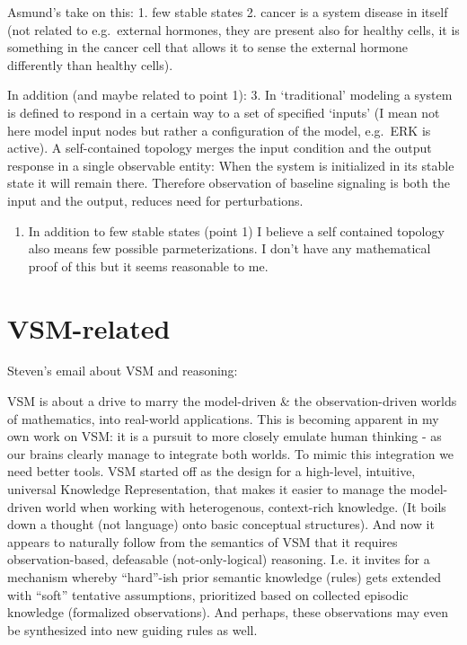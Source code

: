 \documentclass[
  12pt,
]{book}
\providecommand{\tightlist}{%
  \setlength{\itemsep}{0pt}\setlength{\parskip}{0pt}}
\begin{document}
Asmund's take on this:
1. few stable states
2. cancer is a system disease in itself (not related to e.g.~external hormones, they are present also for healthy cells, it is something in the cancer cell that allows it to sense the external hormone differently than healthy cells).

In addition (and maybe related to point 1):
3. In `traditional' modeling a system is defined to respond in a certain way to a set of specified `inputs' (I mean not here model input nodes but rather a configuration of the model, e.g.~ERK is active).
A self-contained topology merges the input condition and the output response in a single observable entity: When the system is initialized in its stable state it will remain there.
Therefore observation of baseline signaling is both the input and the output, reduces need for perturbations.

\begin{enumerate}
\def\labelenumi{\arabic{enumi}.}
\setcounter{enumi}{3}
\tightlist
\item
  In addition to few stable states (point 1) I believe a self contained topology also means few possible parmeterizations.
  I don't have any mathematical proof of this but it seems reasonable to me.
\end{enumerate}

\hypertarget{vsm-related}{%
\section*{VSM-related}\label{vsm-related}}

Steven's email about VSM and reasoning:

VSM is about a drive to marry the model-driven \& the observation-driven worlds of mathematics, into real-world applications.
This is becoming apparent in my own work on VSM: it is a pursuit to more closely emulate human thinking - as our brains clearly manage to integrate both worlds.
To mimic this integration we need better tools.
VSM started off as the design for a high-level, intuitive, universal Knowledge Representation, that makes it easier to manage the model-driven world when working with heterogenous, context-rich knowledge.
(It boils down a thought (not language) onto basic conceptual structures).
And now it appears to naturally follow from the semantics of VSM that it requires observation-based, defeasable (not-only-logical) reasoning.
I.e. it invites for a mechanism whereby ``hard''-ish prior semantic knowledge (rules) gets extended with ``soft'' tentative assumptions, prioritized based on collected episodic knowledge (formalized observations).
And perhaps, these observations may even be synthesized into new guiding rules as well.
\end{document}
